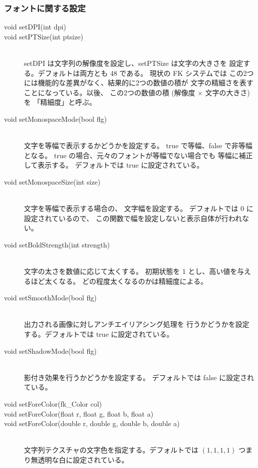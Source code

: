\subsubsection{フォントに関する設定}
\begin{description}
\item[void setDPI(int dpi)]
\item[void setPTSize(int ptsize)] ~ \\
	setDPI は文字列の解像度を設定し、setPTSize は文字の大きさを
	設定する。デフォルトは両方とも 48 である。
	現状の FK システムでは
	この2つには機能的な差異がなく、結果的に2つの数値の積が
	文字の精細さを表すことになっている。以後、
	この2つの数値の積 (解像度 \(\times\) 文字の大きさ) を
	「精細度」と呼ぶ。\\

\item[void setMonospaceMode(bool flg)] ~ \\
	文字を等幅で表示するかどうかを設定する。
	true で等幅、false で非等幅となる。
	true の場合、元々のフォントが等幅でない場合でも
	等幅に補正して表示する。
	デフォルトでは true に設定されている。\\

\item[void setMonospaceSize(int size)] ~ \\
	文字を等幅で表示する場合の、
	文字幅を設定する。
	デフォルトでは 0 に設定されているので、
	この関数で幅を設定しないと表示自体が行われない。\\

\item[void setBoldStrength(int strength)] ~ \\
	文字の太さを数値に応じて太くする。
	初期状態を 1 とし、高い値を与えるほど太くなる。
	どの程度太くなるのかは精細度による。\\

\item[void setSmoothMode(bool flg)] ~ \\
	出力される画像に対しアンチエイリアシング処理を
	行うかどうかを設定する。デフォルトでは true に設定されている。\\

\item[void setShadowMode(bool flg)] ~ \\
	影付き効果を行うかどうかを設定する。
	デフォルトでは false に設定されている。\\

\item[void setForeColor(fk\_Color col)]
\item[void setForeColor(float r, float g, float b, float a)]
\item[void setForeColor(double r, double g, double b, double a)] ~ \\
	文字列テクスチャの文字色を指定する。デフォルトでは
	\((1, 1, 1, 1)\) つまり無透明な白に設定されている。\\


\end{description}
